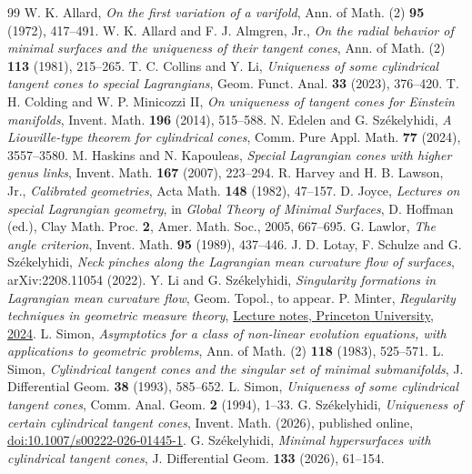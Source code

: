	\begin{thebibliography}{99}
		 W. K. Allard, \emph{On the first variation of a varifold},
		Ann. of Math. (2) \textbf{95} (1972), 417--491.
		 W. K. Allard and F. J. Almgren, Jr.,
		\emph{On the radial behavior of minimal surfaces and the uniqueness of
			their tangent cones}, Ann. of Math. (2) \textbf{113} (1981), 215--265.
		 T. C. Collins and Y. Li, \emph{Uniqueness of some cylindrical
			tangent cones to special Lagrangians}, Geom. Funct. Anal. \textbf{33}
		(2023), 376--420.
		 T. H. Colding and W. P. Minicozzi II, \emph{On uniqueness of
			tangent cones for Einstein manifolds}, Invent. Math. \textbf{196}
		(2014), 515--588.
		 N. Edelen and G. Sz\'ekelyhidi, \emph{A Liouville-type theorem
			for cylindrical cones}, Comm. Pure Appl. Math. \textbf{77} (2024),
		3557--3580.
		 M. Haskins and N. Kapouleas, \emph{Special Lagrangian cones
			with higher genus links}, Invent. Math. \textbf{167} (2007), 223--294.
		 R. Harvey and H. B. Lawson, Jr., \emph{Calibrated geometries},
		Acta Math. \textbf{148} (1982), 47--157.
		 D. Joyce, \emph{Lectures on special Lagrangian geometry},
		in \emph{Global Theory of Minimal Surfaces}, D. Hoffman (ed.),
		Clay Math. Proc. \textbf{2}, Amer. Math. Soc., 2005, 667--695.
		 G. Lawlor, \emph{The angle criterion},
		Invent. Math. \textbf{95} (1989), 437--446.
		 J. D. Lotay, F. Schulze and G. Sz\'ekelyhidi,
		\emph{Neck pinches along the Lagrangian mean curvature flow of surfaces},
		arXiv:2208.11054 (2022).
		 Y. Li and G. Sz\'ekelyhidi,
		\emph{Singularity formations in Lagrangian mean curvature flow},
		Geom. Topol., to appear.
		 P. Minter, \emph{Regularity techniques in geometric
			measure theory},
		\href{https://minterscompactness.wordpress.com/wp-content/uploads/2024/12/reg-in-gmt-notes.pdf}{Lecture notes, Princeton University, 2024}.
		 L. Simon, \emph{Asymptotics for a class of non-linear
			evolution equations, with applications to geometric problems},
		Ann. of Math. (2) \textbf{118} (1983), 525--571.
		 L. Simon, \emph{Cylindrical tangent cones and the singular
			set of minimal submanifolds}, J. Differential Geom. \textbf{38}
		(1993), 585--652.
		 L. Simon, \emph{Uniqueness of some cylindrical tangent
			cones}, Comm. Anal. Geom. \textbf{2} (1994), 1--33.
		 G. Sz\'ekelyhidi, \emph{Uniqueness of certain cylindrical
			tangent cones}, Invent. Math. (2026), published online,
		\href{https://doi.org/10.1007/s00222-026-01445-1}{doi:10.1007/s00222-026-01445-1}.
		 G. Sz\'ekelyhidi, \emph{Minimal hypersurfaces with
			cylindrical tangent cones}, J. Differential Geom. \textbf{133}
		(2026), 61--154.
	\end{thebibliography}
